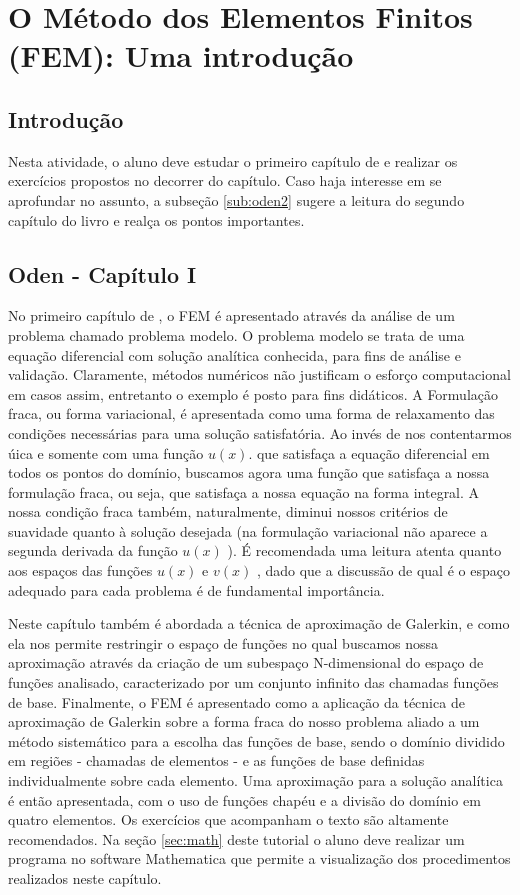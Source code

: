 \documentclass[11pt, oneside, hidelinks]{article}   	%
\begin{document}
\section{O Método dos Elementos Finitos (FEM): Uma introdução}
\subsection*{Introdução}
Nesta atividade, o aluno deve estudar o primeiro capítulo de \citet{oden81} e realizar os exercícios propostos no decorrer do capítulo. Caso haja interesse em se aprofundar no assunto, a subseção \ref{sub:oden2} sugere a leitura do segundo capítulo do livro e realça os pontos importantes.
\subsection{Oden - Capítulo I}
\label{sub:oden1}
No primeiro capítulo de \citet{oden81}, o FEM é apresentado através da análise de um problema chamado problema modelo. O problema modelo se trata de uma equação diferencial com solução analítica conhecida, para fins de análise e validação. Claramente, métodos numéricos não justificam o esforço computacional em casos assim, entretanto o exemplo é posto para fins didáticos. A Formulação fraca, ou forma variacional, é apresentada como uma forma de relaxamento das condições necessárias para uma solução satisfatória. Ao invés de nos contentarmos úica e somente com uma função $u(x)$.
  que satisfaça a equação diferencial em todos os pontos do domínio, buscamos agora uma função que satisfaça a nossa formulação fraca, ou seja, que satisfaça a nossa equação na forma integral. A nossa condição fraca também, naturalmente, diminui nossos critérios de suavidade quanto à solução desejada (na formulação variacional não aparece a segunda derivada da função $u(x)$
 ). É recomendada uma leitura atenta quanto aos espaços das funções $u(x)$  e $v(x)$ , dado que a discussão de qual é o espaço adequado para cada problema é de fundamental importância. 

Neste capítulo também é abordada a técnica de aproximação de Galerkin, e como ela nos permite restringir o espaço de funções no qual buscamos nossa aproximação através da criação de um subespaço N-dimensional do espaço de funções analisado, caracterizado por um conjunto infinito das chamadas funções de base. Finalmente, o FEM é apresentado como a aplicação da técnica de aproximação de Galerkin sobre a forma fraca do nosso problema aliado a um método sistemático para a escolha das funções de base, sendo o domínio dividido em regiões - chamadas de elementos - e as funções de base definidas individualmente sobre cada elemento. Uma aproximação para a solução analítica é então apresentada, com o uso de funções chapéu e a divisão do domínio em quatro elementos. Os exercícios que acompanham o texto são altamente recomendados. Na seção \ref{sec:math} deste tutorial o aluno deve realizar um programa no software Mathematica que permite a visualização dos procedimentos realizados neste capítulo.
\newpage
\end{document}
